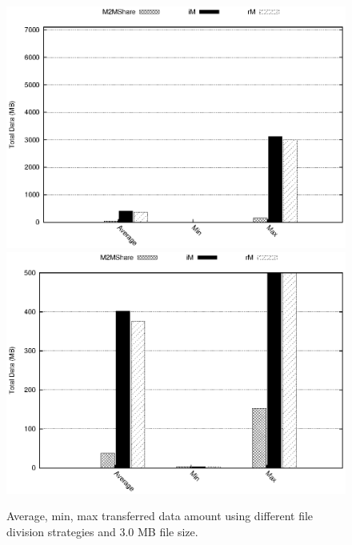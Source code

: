 \begin{figure}[htbp]
\centering%
\subfigure%
{\includegraphics{grafici/dataDFS_3MB.eps}}\qquad\qquad
\subfigure%
{\includegraphics{grafici/dataDFS_3MB_zoom.eps}}
\caption{Average, min, max transferred data amount using different file division strategies and 3.0 MB file size.\label{graficoDataFDS_3MB}}
\end{figure}

